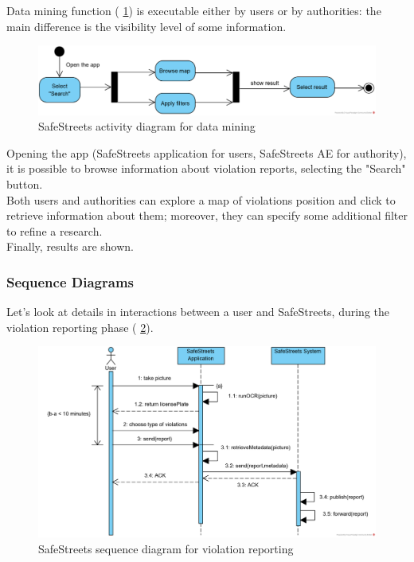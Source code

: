 \documentclass{article}
\begin{document}
			\clearpage
			Data mining function (\figurename{ \ref{fig:activitydiagram_datamining}}) is executable either by users or by authorities: the main difference is the visibility level of some information.
			\begin{figure}[H]
				\centering
				\includegraphics[width=1\textwidth]{diagrams/activity_dataMining.png}
				\caption[SafeStreets activity diagram]{SafeStreets activity diagram for data mining}
				\label{fig:activitydiagram_datamining}
			\end{figure}
			Opening the app (SafeStreets application for users, SafeStreets AE for authority), it is possible to browse information about violation reports, selecting the "Search" button.\\
			Both users and authorities can explore a map of violations position and click to retrieve information about them; moreover, they can specify some additional filter to refine a research.\\
			Finally, results are shown.
			
			\clearpage
			\subsubsection{Sequence Diagrams}
			Let's look at details in interactions between a user and SafeStreets, during the violation reporting phase (\figurename{ \ref{fig:sequencediagram_reporting}}).
			
			\begin{figure}[H]
				\centering
				\includegraphics[width=1\textwidth]{diagrams/sequence_reportViolation.png}
				\caption[SafeStreets sequence diagram]{SafeStreets sequence diagram for violation reporting}
				\label{fig:sequencediagram_reporting}
			\end{figure}
			
\end{document}
